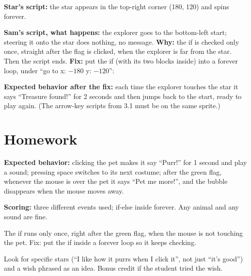 \begin{answer}
\textbf{Star's script:} the star appears in the top-right corner (180, 120) and spins forever.

\textbf{Sam's script, what happens:} the explorer goes to the bottom-left start; steering it onto the star does nothing, no message.
\textbf{Why:} the if is checked only once, straight after the flag is clicked, when the explorer is far from the star. Then the script ends.
\textbf{Fix:} put the if (with its two blocks inside) into a forever loop, under \enquote{go to x: $-180$ y: $-120$}:
\begin{center}
\begin{scratch}[scale=0.8]
\end{scratch}
\end{center}
\textbf{Expected behavior after the fix:} each time the explorer touches the star it says \enquote{Treasure found!} for 2 seconds and then jumps back to the start, ready to play again. (The arrow-key scripts from 3.1 must be on the same sprite.)
\end{answer}

\section{Homework}
\begin{answer}
\textbf{Expected behavior:} clicking the pet makes it say \enquote{Purr!} for 1 second and play a sound; pressing space switches to its next costume; after the green flag, whenever the mouse is over the pet it says \enquote{Pet me more!}, and the bubble disappears when the mouse moves away.

\textbf{Scoring:} three different events used; if-else inside forever. Any animal and any sound are fine.
\end{answer}

\begin{answer}
The if runs only once, right after the green flag, when the mouse is not touching the pet. Fix: put the if inside a forever loop so it keeps checking.
\end{answer}

\begin{answer}
Look for specific stars (\enquote{I like how it purrs when I click it}, not just \enquote{it's good}) and a wish phrased as an idea. Bonus credit if the student tried the wish.
\end{answer}
